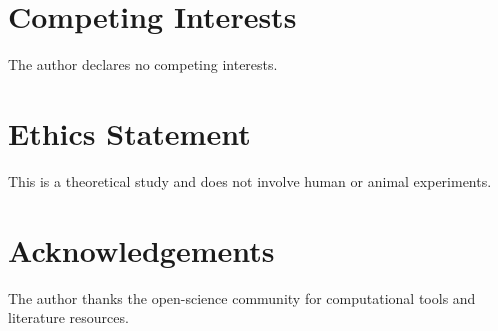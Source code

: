 \documentclass[11pt,a4paper]{article}
\begin{document}
\section{Competing Interests}

The author declares no competing interests.

\section{Ethics Statement}

This is a theoretical study and does not involve human or animal experiments.

\section{Acknowledgements}

The author thanks the open-science community for computational tools and literature resources.
\end{document}

